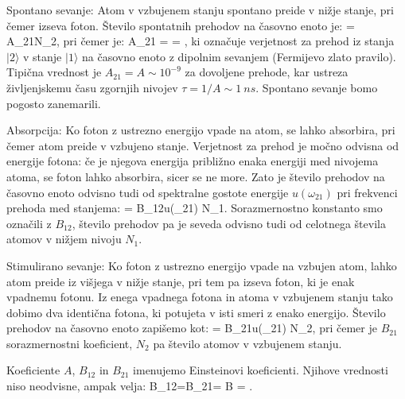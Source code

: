 Spontano sevanje: Atom v vzbujenem stanju spontano preide v nižje stanje, pri čemer izseva
foton. Število spontatnih prehodov na časovno enoto je:
\beq
{} = A_{21}N_2,
\label{eq:11_04}
\eeq
pri čemer je:
\beq
A_{21} =  = 
,
\eeq
ki označuje verjetnost za prehod iz stanja $|2\rangle$ v stanje $|1\rangle$ na časovno enoto
z dipolnim sevanjem (Fermijevo zlato pravilo). Tipična vrednost je $A_{21}  = A \sim 10^{-9}$ za 
dovoljene prehode, kar ustreza življenjskemu času zgornjih nivojev $\tau = 1/A \sim 1~\si{ns}$. 
Spontano sevanje bomo pogosto zanemarili. 

Absorpcija: Ko foton z ustrezno energijo vpade na atom, se lahko absorbira, pri čemer atom 
preide v vzbujeno stanje. Verjetnost za prehod je močno odvisna od energije fotona: če je 
njegova energija približno enaka energiji med nivojema atoma, se foton lahko absorbira, sicer
se ne more. Zato je število prehodov na časovno enoto odvisno tudi od spektralne gostote 
energije $u(\omega_{21})$ pri frekvenci prehoda med stanjema:
\beq
{} = B_{12}u(\omega_{21}) N_1.
\eeq
Sorazmernostno konstanto smo označili z $B_{12}$, število prehodov pa je seveda odvisno
tudi od celotnega števila atomov v nižjem nivoju $N_1$.

Stimulirano sevanje: Ko foton z ustrezno energijo vpade na vzbujen atom, lahko atom preide
iz višjega v nižje stanje, pri tem pa izseva foton, ki je enak vpadnemu fotonu. Iz enega 
vpadnega fotona in atoma v vzbujenem stanju tako dobimo dva identična fotona, ki potujeta v isti smeri
z enako energijo. Število prehodov na časovno enoto zapišemo kot:
\beq
{} = B_{21}u(\omega_{21}) N_2,
\eeq
pri čemer je $B_{21}$ sorazmernostni koeficient, $N_2$ pa število atomov v vzbujenem stanju. 

Koeficiente $A$, $B_{12}$ in $B_{21}$ imenujemo Einsteinovi koeficienti. Njihove vrednosti 
niso neodvisne, ampak velja:
\beq
B_{12}=B_{21}= B \qquad {} \qquad {} = .
\eeq

